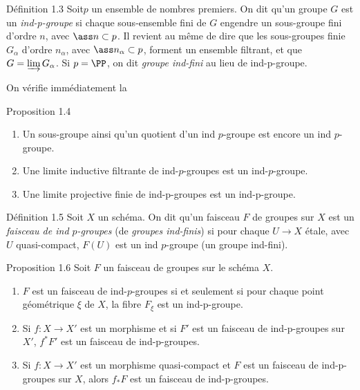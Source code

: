 \documentclass[10pt]{../fichiers-configuration-latex/smfart}
\begin{document}
\begin{enonce*}{Définition 1.3}
Soit\pageoriginale $p$ un ensemble de nombres premiers. On dit qu'un
groupe $G$ est un \emph{ind-p-groupe} si chaque sous-ensemble fini de $G$
engendre un sous-groupe fini d'ordre $n$, avec $\ass n\subset p$. Il
revient au même de dire que les sous-groupes finie $G_{\alpha}$
d'ordre $n_{\alpha}$, avec $\ass n_{\alpha}\subset p$, forment un
ensemble filtrant, et que $G=\varinjlim G_{\alpha}$. Si
$p=\PP$, on dit \emph{groupe ind-fini} au lieu de ind-p-groupe.
\end{enonce*}

On vérifie immédiatement la
\begin{enonce*}{Proposition 1.4}
\begin{enumerate}
\renewcommand{\theenumi}{\roman{enumi}}
\renewcommand{\labelenumi}{(\theenumi)}
\item Un sous-groupe ainsi qu'un quotient d'un ind $p$-groupe est
  encore un ind $p$-groupe.

\item Une limite inductive filtrante de ind-$p$-groupes est un
  ind-$p$-groupe.

\item Une limite projective finie de ind-p-groupes est un ind-p-groupe.
\end{enumerate}
\end{enonce*}

\begin{enonce*}{Définition 1.5}
Soit $X$ un schéma. On dit qu'un faisceau $F$ de groupes sur $X$ est
un \emph{faisceau de ind $p$-groupes} (\resp de \emph{groupes
  ind-finis})
si pour chaque $U\rightarrow X$ étale, avec $U$ quasi-compact, $F(U)$ est un
ind $p$-groupe (\resp un groupe ind-fini).
\end{enonce*}

\begin{enonce*}{Proposition 1.6}
Soit $F$ un faisceau de groupes sur le schéma $X$.
\begin{enumerate}
\renewcommand{\theenumi}{\roman{enumi}}
\renewcommand{\labelenumi}{(\theenumi)}
\item $F$ est un faisceau de ind-$p$-groupes si et seulement si pour
  chaque point géométrique $\xi$ de $X$, la fibre $F_{\xi}$ est un
  ind-p-groupe.

\item Si $f:X\rightarrow X'$ est un morphisme et si $F'$ est un
  faisceau de ind-p-groupes sur $X'$, $f^{\ast}F'$ est un faisceau de
  ind-p-groupes.

\item Si $f:X\rightarrow X'$ est un morphisme quasi-compact et $F$ est
  un faisceau de ind-p-groupes sur $X$, alors $f_{\ast}F$ est un
  faisceau de ind-p-groupes.
\end{enumerate}
\end{enonce*}
\end{document}
